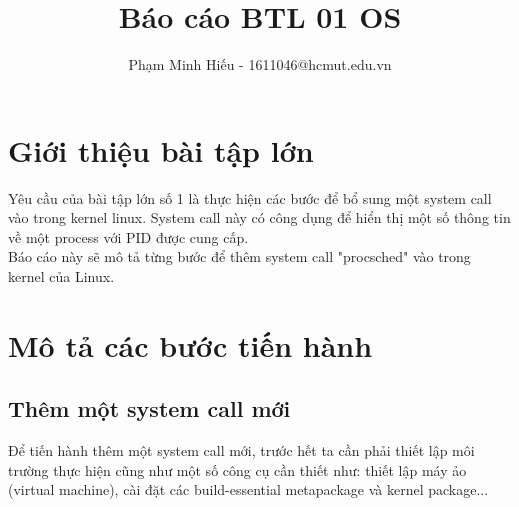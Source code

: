 \documentclass[12pt,a4paper,titlepage]{article}
\author{Phạm Minh Hiếu - 1611046@hcmut.edu.vn}
\title{Báo cáo BTL 01 OS}
\begin{document}
	
	
	\fontsize{12pt}{16} \selectfont
	\newpage\tableofcontents\thispagestyle{empty} 
	\newpage\setcounter{page}{1}
	
	\paragraph*{}\vspace{1.5cm}
	\listoffigures{}
	
	\newpage
	
	
	
	
	\section{Giới thiệu bài tập lớn}
	Yêu cầu của bài tập lớn số 1 là thực hiện các bước để bổ sung một system call
	vào trong kernel linux. System call này có công dụng để hiển thị một số thông
	tin về một process với PID được cung cấp. \\
	Báo cáo này sẽ mô tả từng bước để thêm system call "procsched" vào trong kernel
	của Linux.\\
	\section{Mô tả các bước tiến hành}
	\subsection{Thêm một system call mới}
	
	Để tiến hành thêm một system call mới, trước hết ta cần phải thiết lập môi
	trường thực hiện cũng như một số công cụ cần thiết như: thiết lập máy ảo
	(virtual machine), cài đặt các build-essential metapackage và kernel
	package...\\
	
\end{document}
